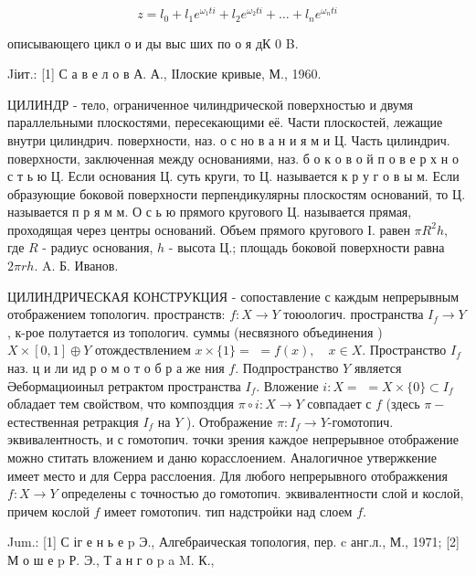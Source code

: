 \documentclass[10pt]{article}
\begin{document}
\[

z=l_{0}+l_{1} e^{\omega_{1} t i}+l_{2} e^{\omega_{2} t i}+\ldots+l_{n} e^{\omega_{n} t i}

\]



описывающего цикл о и ды выс ших по о я дК 0 B.



Jіит.: [1] С а в е л о в А. А., ІІлоские кривые, М., 1960.



ЦИЛИНДР - тело, ограниченное чилиндрической поверхностью и двумя параллельными плоскостями, пересекающими её. Части плоскостей, лежащие внутри цилиндрич. поверхности, наз. о с но в а н и я м и Ц. Часть цилиндрич. поверхности, заключенная между основаниями, наз. б о к о в о й п о в е р х н о с т ь ю Ц. Если основания Ц. суть круги, то Ц. называется к р у г о в ы м. Если образующие боковой поверхности перпендикулярны плоскостям оснований, то Ц. называется п р я м м. О с ь ю прямого кругового Ц. называется прямая, проходящая через центры оснований. Объем прямого кругового І. равен $\pi R^{2} h$, где $R$ - радиус основания, $h$ - высота Ц.; площадь боковой поверхности равна $2 \pi r h$. A. Б. Иванов.



ЦИЛИНДРИЧЕСКАЯ КОНСТРУКЦИЯ - сопоставление с каждым непрерывным отображением топологич. пространств: $f: X \rightarrow Y$ тоюологич. пространства $I_{f} \rightarrow Y$, к-рое полутается из топологич. суммы (несвязного объединения ) $X \times[0,1] \oplus Y$ отождествлением $x \times\{1\}=$ $=f(x), \quad x \in X$. Пространство $I_{f}$ наз. ц и ли ид р о м о т о б р а же ния $f$. Подпространство $Y$ является Әебормациоиныл ретрактом пространства $I_{f}$. Вложение $i: X=$ $=X \times\{0\} \subset I_{f}$ обладает тем свойством, что композдция $\pi \circ i: X \rightarrow Y$ совпадает с $f$ (здесь $\pi-$ естественная ретракция $I_{f}$ на $Y$ ). Отображение $\pi: I_{f} \rightarrow Y$-гомотопич. эквивалентность, и с гомотопич. точки зрения каждое непрерывное отображение можно ститать вложением и даню корасслоением. Аналогичное утвержкение имеет место и для Серра расслоения. Для любого непрерывного отображкения $f: X \rightarrow Y$ определены с точностью до гомотопич. эквивалентности слой и кослой, причем кослой $f$ имеет гомотопич. тип надстроӥки над слоем $f$.



Jum.: [1] С іг е н ь е p Э., Алгебраическая топология, пер. c анг.л., М., 1971; [2] М о ш е p Р. Э., Т а н г о p a M. К.,
\end{document}
